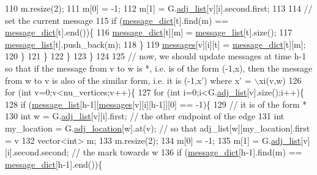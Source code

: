 \begin{DoxyCode}
110           m.resize(2);
111           m[0] = -1;
112           m[1] = G.\hyperlink{classmarked__graph_a1a0bf7ca413a278763f7c878b3b6fd6f}{adj\_list}[v][i].second.first;
113 
114           \textcolor{comment}{// set the current message}
115           \textcolor{keywordflow}{if} (\hyperlink{classgraph__message_ad0a6d35ac8550fb7ff03ce90fce7d5a5}{message\_dict}[t].find(m) == \hyperlink{classgraph__message_ad0a6d35ac8550fb7ff03ce90fce7d5a5}{message\_dict}[t].end())\{
116             \hyperlink{classgraph__message_ad0a6d35ac8550fb7ff03ce90fce7d5a5}{message\_dict}[t][m] = \hyperlink{classgraph__message_aa17fdb629b423343edfafa97252763ef}{message\_list}[t].size();
117             \hyperlink{classgraph__message_aa17fdb629b423343edfafa97252763ef}{message\_list}[t].push\_back(m);
118           \}
119           \hyperlink{classgraph__message_aac77e098f0acf9650116a8e51fe3b4b7}{messages}[v][i][t] = \hyperlink{classgraph__message_ad0a6d35ac8550fb7ff03ce90fce7d5a5}{message\_dict}[t][m];
120         \}
121       \}
122     \}
123   \}
124 
125   \textcolor{comment}{// now, we should update messages at time h-1 so that if the message from v to w is *, i.e. is of the
       form (-1,x), then the message from w to v is also of the similar form, i.e. it is (-1,x') where x' = \(\backslash\)xi(v,w)}
126   \textcolor{keywordflow}{for} (\textcolor{keywordtype}{int} v=0;v<nu\_vertices;v++)\{
127     \textcolor{keywordflow}{for} (\textcolor{keywordtype}{int} i=0;i<G.\hyperlink{classmarked__graph_a1a0bf7ca413a278763f7c878b3b6fd6f}{adj\_list}[v].size();i++)\{
128       \textcolor{keywordflow}{if} (\hyperlink{classgraph__message_aa17fdb629b423343edfafa97252763ef}{message\_list}[h-1][\hyperlink{classgraph__message_aac77e098f0acf9650116a8e51fe3b4b7}{messages}[v][i][h-1]][0] == -1)\{
129         \textcolor{comment}{// it is of the form *}
130         \textcolor{keywordtype}{int} w = G.\hyperlink{classmarked__graph_a1a0bf7ca413a278763f7c878b3b6fd6f}{adj\_list}[v][i].first; \textcolor{comment}{// the other endpoint of the edge}
131         \textcolor{keywordtype}{int} my\_location = G.\hyperlink{classmarked__graph_a3ae722ea9583ad23af34d789a88ac01a}{adj\_location}[w].at(v); \textcolor{comment}{// so that adj\_list[w][my\_location].first =
       v}
132         vector<int> m;
133         m.resize(2);
134         m[0] = -1;
135         m[1] = G.\hyperlink{classmarked__graph_a1a0bf7ca413a278763f7c878b3b6fd6f}{adj\_list}[v][i].second.second; \textcolor{comment}{// the mark towards w}
136         \textcolor{keywordflow}{if} (\hyperlink{classgraph__message_ad0a6d35ac8550fb7ff03ce90fce7d5a5}{message\_dict}[h-1].find(m) == \hyperlink{classgraph__message_ad0a6d35ac8550fb7ff03ce90fce7d5a5}{message\_dict}[h-1].end())\{

\end{DoxyCode}
